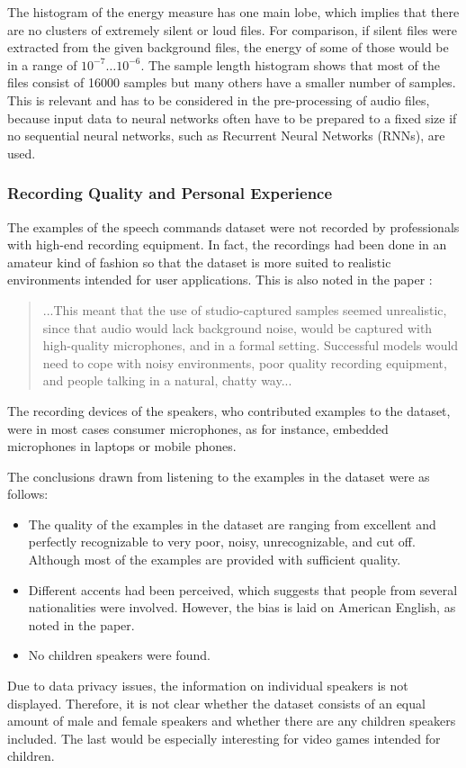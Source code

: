 \FloatBarrier
\noindent
The histogram of the energy measure has one main lobe, which implies that there are no clusters of extremely silent or loud files.
For comparison, if silent files were extracted from the given background files, the energy of some of those would be in a range of $10^{-7} \dots 10^{-6}$.
The sample length histogram shows that most of the files consist of 16000 samples but many others have a smaller number of samples. 
This is relevant and has to be considered in the pre-processing of audio files, because input data to neural networks often have to be prepared to a fixed size if no sequential neural networks, such as Recurrent Neural Networks (RNNs), are used.



\subsubsection{Recording Quality and Personal Experience}
The examples of the speech commands dataset \cite{Warden2018SpeechCommands} were not recorded by professionals with high-end recording equipment.
In fact, the recordings had been done in an amateur kind of fashion so that the dataset is more suited to realistic environments intended for user applications.
This is also noted in the paper \cite{Warden2018SpeechCommands}:
\begin{quote}
...This meant that the use of studio-captured samples seemed unrealistic, since that audio would lack background noise, would be captured with high-quality microphones, and in a formal setting. 
Successful models would need to cope with noisy environments, poor quality recording equipment, and people talking in a natural, chatty way...
\end{quote}
The recording devices of the speakers, who contributed examples to the dataset, were in most cases consumer microphones, as for instance, embedded microphones in laptops or mobile phones.

The conclusions drawn from listening to the examples in the dataset were as follows:
\begin{itemize}
  \item The quality of the examples in the dataset are ranging from excellent and perfectly recognizable to very poor, noisy, unrecognizable, and cut off. Although most of the examples are provided with sufficient quality.
  \item Different accents had been perceived, which suggests that people from several nationalities were involved.
  However, the bias is laid on American English, as noted in the paper.
  \item No children speakers were found.
\end{itemize}
Due to data privacy issues, the information on individual speakers is not displayed.
Therefore, it is not clear whether the dataset consists of an equal amount of male and female speakers and whether there are any children speakers included.
The last would be especially interesting for video games intended for children.

